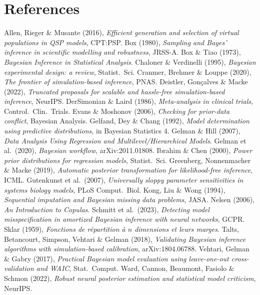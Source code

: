 \documentclass[11pt]{article}
\begin{document}
\section*{References}
\small\raggedright
Allen, Rieger \& Musante (2016), \emph{Efficient generation and selection of virtual
populations in QSP models}, CPT:PSP.\quad
Box (1980), \emph{Sampling and Bayes' inference in scientific modelling and robustness},
JRSS-A.\quad
Box \& Tiao (1973), \emph{Bayesian Inference in Statistical Analysis}.\quad
Chaloner \& Verdinelli (1995), \emph{Bayesian experimental design: a review}, Statist.\
Sci.\quad
Cranmer, Brehmer \& Louppe (2020), \emph{The frontier of simulation-based inference},
PNAS.\quad
Deistler, Gon\c{c}alves \& Macke (2022), \emph{Truncated proposals for scalable and
hassle-free simulation-based inference}, NeurIPS.\quad
DerSimonian \& Laird (1986), \emph{Meta-analysis in clinical trials}, Control.\ Clin.\
Trials.\quad
Evans \& Moshonov (2006), \emph{Checking for prior-data conflict}, Bayesian Analysis.\quad
Gelfand, Dey \& Chang (1992), \emph{Model determination using predictive distributions},
in Bayesian Statistics 4.\quad
Gelman \& Hill (2007), \emph{Data Analysis Using Regression and Multilevel/Hierarchical
Models}.\quad
Gelman et al.\ (2020), \emph{Bayesian workflow}, arXiv:2011.01808.\quad
Ibrahim \& Chen (2000), \emph{Power prior distributions for regression models},
Statist.\ Sci.\quad
Greenberg, Nonnenmacher \& Macke (2019), \emph{Automatic posterior transformation for
likelihood-free inference}, ICML.\quad
Gutenkunst et al.\ (2007), \emph{Universally sloppy parameter sensitivities in systems
biology models}, PLoS Comput.\ Biol.\quad
Kong, Liu \& Wong (1994), \emph{Sequential imputation and Bayesian missing data problems},
JASA.\quad
Nelsen (2006), \emph{An Introduction to Copulas}.\quad
Schmitt et al.\ (2023), \emph{Detecting model misspecification in amortized Bayesian
inference with neural networks}, GCPR.\quad
Sklar (1959), \emph{Fonctions de r\'epartition \`a $n$ dimensions et leurs marges}.\quad
Talts, Betancourt, Simpson, Vehtari \& Gelman (2018), \emph{Validating Bayesian inference
algorithms with simulation-based calibration}, arXiv:1804.06788.\quad
Vehtari, Gelman \& Gabry (2017), \emph{Practical Bayesian model evaluation using
leave-one-out cross-validation and WAIC}, Stat.\ Comput.\quad
Ward, Cannon, Beaumont, Fasiolo \& Schmon (2022), \emph{Robust neural posterior estimation
and statistical model criticism}, NeurIPS.
\end{document}
